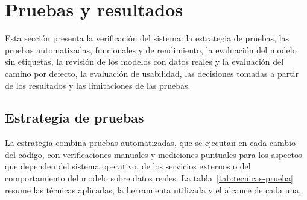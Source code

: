\chapter{Pruebas y resultados}
\label{chap:pruebas}

Esta sección presenta la verificación del sistema: la estrategia de pruebas, las pruebas automatizadas, funcionales y de rendimiento, la evaluación del modelo sin etiquetas, la revisión de los modelos con datos reales y la evaluación del camino por defecto, la evaluación de usabilidad, las decisiones tomadas a partir de los resultados y las limitaciones de las pruebas.
\section{Estrategia de pruebas}
\label{sec:estrategia-pruebas}
La estrategia combina pruebas automatizadas, que se ejecutan en cada cambio del código, con verificaciones manuales y mediciones puntuales para los aspectos que dependen del sistema operativo, de los servicios externos o del comportamiento del modelo sobre datos reales. La tabla~\ref{tab:tecnicas-prueba} resume las técnicas aplicadas, la herramienta utilizada y el alcance de cada una.

